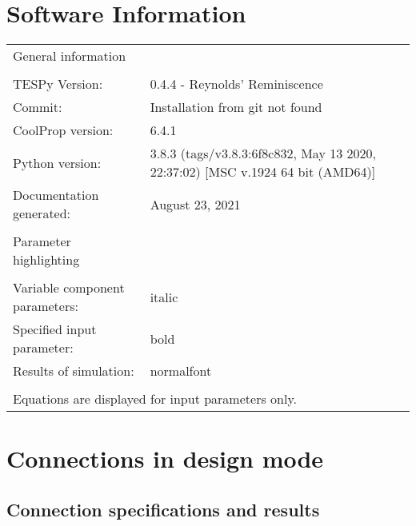 \documentclass[]{article}
\newcommand{\iftab}{\fontshape{sl}\selectfont}
\newcommand{\bftab}{\fontseries{b}\selectfont}
\begin{document}
\section*{Software Information}

\begin{table}[H]
\begin{tabular}{ll}
\bftab General information&\\
& \\
TESPy Version:&0.4.4 - Reynolds' Reminiscence\\
Commit:&Installation from git not found\\
CoolProp version:&6.4.1\\
Python version:&3.8.3 (tags/v3.8.3:6f8c832, May 13 2020, 22:37:02) [MSC v.1924 64 bit (AMD64)]\\
Documentation generated:&August 23, 2021\\
& \\
\bftab Parameter highlighting&\\
& \\
Variable component parameters:& \iftab italic\\
Specified input parameter:& \bftab bold\\
Results of simulation:& normalfont \\
& \\
\multicolumn{2}{l}{\iftab Equations are displayed for input parameters only.}\\
\end{tabular}
\end{table}
\newpage\section{Connections in design mode}

\subsection{Connection specifications and results}
\end{document}
